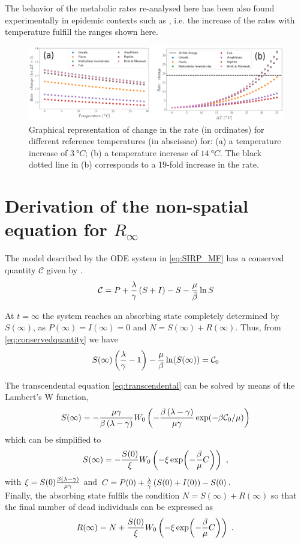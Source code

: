 The behavior of the metabolic rates re-analysed here has been also found
experimentally in epidemic contexts such as \cite{COELHO2006, Shapiro2017},
i.e. the increase of the rates with temperature fulfill the ranges shown here.

\begin{figure}[H]
    \centering
    \includegraphics[width=1\textwidth]{Figures/arrhenius.png}
    \caption{Graphical representation of change in the rate (in ordinates)
        for different reference temperatures (in abscissae) for: (a) a
        temperature
        increase of $\SI{3}{\degree C}$; (b)  a temperature increase of
        $\SI{14}{\degree C}$. The black dotted line in (b) corresponds to a
        $19$-fold
        increase in the rate.
    }
    \label{fig:rate_changes}
\end{figure}

\section{Derivation of the non-spatial equation for $R_{\infty}$}
\label{app:Rinf}

The model described by the ODE system in \cref{eq:SIRP_MF} has a conserved
quantity $\mathcal{C}$ given by \cite{GimenezRomero2021}.
\begin{equation}\label{eq:conservedquantity}
    \mathcal{C}=P +
    \frac{\lambda}{\gamma}\left(S+I\right)-S-\frac{\mu}{\bar{\beta}}\ln S
\end{equation}

At $t=\infty$ the system reaches an absorbing state completely determined
by $S(\infty)$, as $P(\infty)=I(\infty)=0$ and $N=S(\infty)+R(\infty)$. Thus,
from \cref{eq:conservedquantity} we have
\begin{equation}\label{eq:transcendental}
    S(\infty)\left(\frac{\lambda}{\gamma}-1\right)-
    \frac{\mu}{\beta}\ln(S(\infty))=\mathcal{C}_0
\end{equation}

The transcendental equation \cref{eq:transcendental} can be solved by means
of the Lambert's W function,
\begin{equation}
    S(\infty)=-\frac{\mu\gamma}{\beta\left(\lambda-\gamma\right)}
    W_0\left(-\frac{\beta\left(\lambda-\gamma\right)}{\mu\gamma}
        \exp(-\beta\mathcal{C}_0/\mu)\right)
\end{equation}
which can be simplified to
\begin{equation}\label{eq: S_inf}
    S(\infty)=-\frac{S(0)}{\xi}W_0\left(-\xi\exp(-\frac{\beta}{\mu}C)\right)
    \ ,
\end{equation}
with $\xi=S(0)\frac{\beta\left(\lambda-\gamma\right)}{\mu\gamma}$ and
$C=P(0)+\frac{\lambda}{\gamma}\left(S(0)+I(0)\right)-S(0)$.\\

Finally, the absorbing state fulfils the condition $N=S(\infty)+R(\infty)$
so that the final number of dead individuals can be expressed as
\begin{equation}
    R(\infty)=N+\frac{S(0)}{\xi}W_0\left(-\xi\exp(-\frac{\beta}{\mu}C)\right) \
    .
\end{equation}